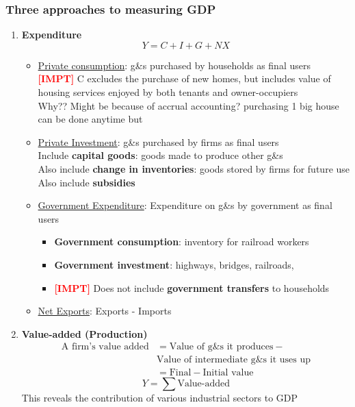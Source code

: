 \documentclass{article}
\newcommand{\impt}[0]{\textcolor{red}{\textbf{[IMPT] }}}
\begin{document}
\begin{multicols}{2}
\subsubsection{Three approaches to measuring GDP}
\begin{enumerate}
	\item \textbf{Expenditure}
	$$Y = C + I + G + NX$$
	\begin{itemize}
		\item \underline{Private consumption}: g\&s purchased by households as final users\\
		\impt C excludes the purchase of new homes, but includes value of housing services enjoyed by both tenants and owner-occupiers\\
		Why?? Might be because of accrual accounting? purchasing 1 big house can be done anytime but
		\item \underline{Private Investment}: g\&s purchased by firms as final users\\
		Include \textbf{capital goods}: goods made to produce other g\&s\\
		Also include \textbf{change in inventories}: goods stored by firms for future use\\
		Also include \textbf{subsidies}
		\item \underline{Government Expenditure}: Expenditure on g\&s by government as final users
		\begin{itemize}
			\item \textbf{Government consumption}: inventory for railroad workers
			\item \textbf{Government investment}: highways, bridges, railroads,
			\item \impt Does not include \textbf{government transfers} to households
		\end{itemize}
	\item \underline{Net Exports}: Exports - Imports
	\end{itemize}
	\item \textbf{Value-added (Production)}
	\begin{equation*}
		\begin{aligned}
\text{A firm's value added} &= \text{Value of g\&s it produces}-\\ &\text{Value of intermediate g\&s it uses up}\\
&= \text{Final} - \text{Initial value}
		\end{aligned}
	\end{equation*}
$$Y = \sum \text{Value-added}$$
This reveals the contribution of various industrial sectors to GDP

\end{enumerate}
\end{multicols}
\end{document}
